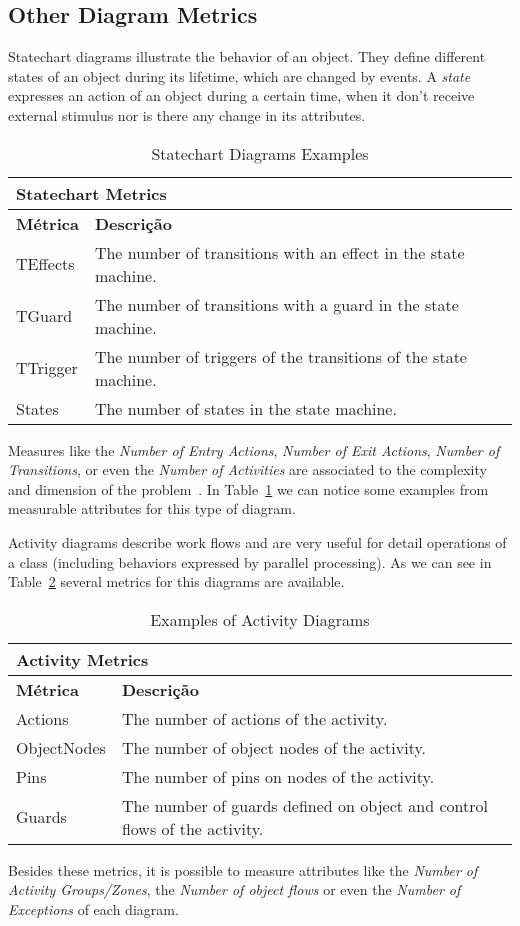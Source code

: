 \subsection{Other Diagram Metrics}

Statechart diagrams illustrate the behavior of an object.
They define different states of an object during its lifetime, which are changed by events.
A \emph{state} expresses an action of an object during a certain time, when it don't receive external stimulus nor is there any change in its attributes. 

\begin{table}[h]\centering
\begin{tabular}{ p{2cm} | p{}}
\multicolumn{2}{l}{\textbf{Statechart Metrics}} \\ \hline
\textbf{Métrica}  & \textbf{Descrição} \\ \hline
TEffects  & The number of transitions with an effect in the state machine. \\ \hline 
TGuard & The number of transitions with a guard in the state machine. \\ \hline 
TTrigger & The number of triggers of the transitions of the state machine. \\ \hline 
States & The number of states in the state machine. \\ \hline 
\end{tabular}
\caption{\small{Statechart Diagrams Examples}}
\label{t:estado}
\end{table}

Measures like the \emph{Number of Entry Actions}, \emph{Number of Exit Actions}, \emph{Number of Transitions}, or even the \emph{Number of Activities} are associated to the complexity and dimension of the problem~\cite{EVMmdm}.
In Table~\ref{t:estado} we can notice some examples from measurable attributes for this type of diagram.

Activity diagrams describe work flows and are very useful for detail operations of a class (including behaviors expressed by parallel processing).
As we can see in Table~\ref{t:act} several metrics for this diagrams are available.

\begin{table}[h]\centering
\begin{tabular}{ p{2cm}|   p{}}
\multicolumn{2}{l}{\textbf{Activity Metrics}} \\ \hline
\textbf{Métrica} & \textbf{Descrição} \\ \hline
Actions  & The number of actions of the activity. \\ \hline 
ObjectNodes & The number of object nodes of the activity. \\ \hline 
Pins  & The number of pins on nodes of the activity. \\ \hline 
Guards  & The number of guards defined on object and control flows of the activity. \\ \hline 
\end{tabular}
\caption{\small{Examples of Activity Diagrams}}
\label{t:act}
\end{table}

Besides these metrics, it is possible to measure attributes like the \emph{Number of Activity Groups/Zones}, the \emph{Number of object flows} or even the \emph{Number of Exceptions} of each diagram. 
